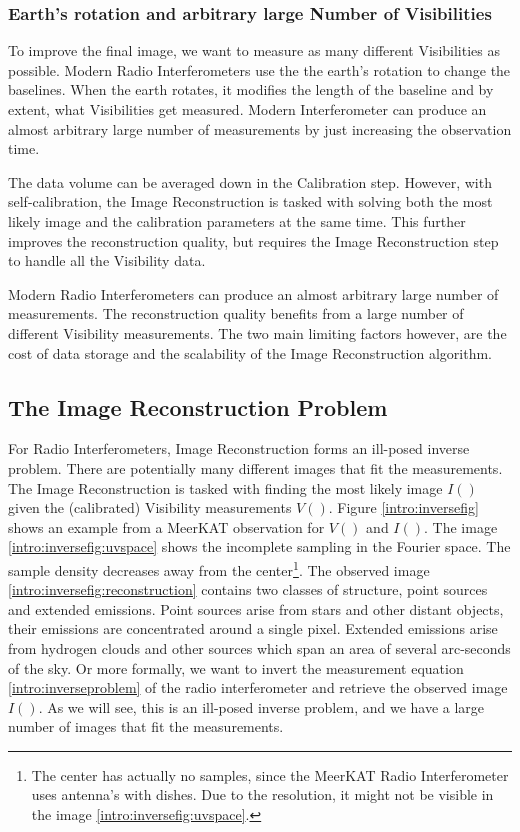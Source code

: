 \subsubsection{Earth's rotation and arbitrary large Number of Visibilities}
To improve the final image, we want to measure as many different Visibilities as possible. Modern Radio Interferometers use the the earth's rotation to change the baselines. When the earth rotates, it modifies the length of the baseline and by extent, what Visibilities get measured. Modern Interferometer can produce an almost arbitrary large number of measurements by just increasing the observation time.

The data volume can be averaged down in the Calibration step. However, with self-calibration, the Image Reconstruction is tasked with solving both the most likely image and the calibration parameters at the same time. This further improves the reconstruction quality\cite{Wiauxselfcal}, but requires the Image Reconstruction step to handle all the Visibility data.

Modern Radio Interferometers can produce an almost arbitrary large number of measurements. The reconstruction quality benefits from a large number of different Visibility measurements. The two main limiting factors however, are the cost of data storage and the scalability of the Image Reconstruction algorithm.


\subsection{The Image Reconstruction Problem}\label{intro:reconstruction}
For Radio Interferometers, Image Reconstruction forms an ill-posed inverse problem. There are potentially many different images that fit the measurements. The Image Reconstruction is tasked with finding the most likely image $I()$ given the (calibrated) Visibility measurements $V()$.  Figure \ref{intro:inversefig} shows an example from a MeerKAT observation for $V()$ and $I()$. The image \ref{intro:inversefig:uvspace} shows the incomplete sampling in the Fourier space. The sample density decreases away from the center\footnote{The center has actually no samples, since the MeerKAT Radio Interferometer uses antenna's with dishes. Due to the resolution, it might not be visible in the image \ref{intro:inversefig:uvspace}.}. The observed image \ref{intro:inversefig:reconstruction} contains two classes of structure, point sources and extended emissions. Point sources arise from stars and other distant objects, their emissions are concentrated around a single pixel. Extended emissions arise from hydrogen clouds and other sources which span an area of several arc-seconds of the sky. Or more formally, we want to invert the measurement equation \eqref{intro:inverseproblem} of the radio interferometer and retrieve the observed image $I()$. As we will see, this is an ill-posed inverse problem, and we have a large number of images that fit the measurements.

